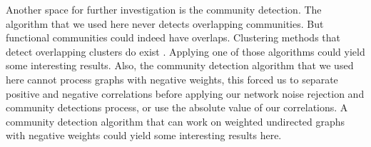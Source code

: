 Another space for further investigation is the community detection. The algorithm that we used here never detects overlapping communities. But functional communities could indeed have overlaps. Clustering methods that detect overlapping clusters do exist \parencite{baadel}. Applying one of those algorithms could yield some interesting results. Also, the community detection algorithm that we used here cannot process graphs with negative weights, this forced us to separate positive and negative correlations before applying our network noise rejection and community detections process, or use the absolute value of our correlations. A community detection algorithm that can work on weighted undirected graphs with negative weights could yield some interesting results here.
